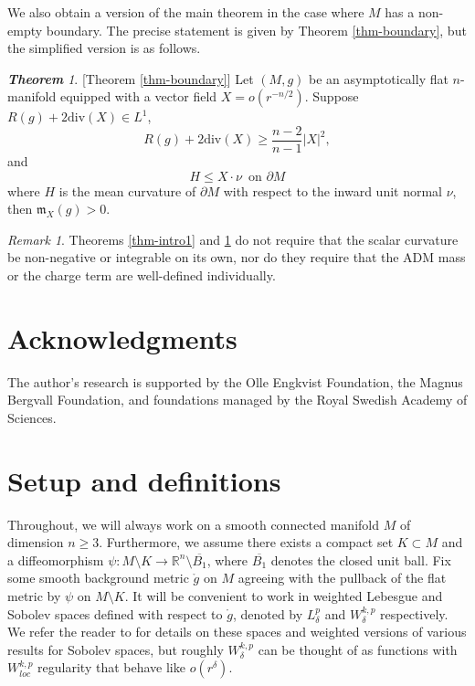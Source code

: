 \documentclass[a4paper,11pt,reqno]{amsart}
\theoremstyle{plain}
\theoremstyle{definition}
\theoremstyle{remark}
\newtheorem{rem}[thm]{Remark}
\newcommand{\m}{\mathfrak{m}}
\numberwithin{equation}{section}
\newtheorem{introthm}{\bf Theorem}
\begin{document}
We also obtain a version of the main theorem in the case where $M$ has a non-empty boundary. The precise statement is given by Theorem \ref{thm-boundary}, but the simplified version is as follows.
\begin{introthm}\label{thm-intro2}[Theorem \ref{thm-boundary}]
	Let $(M,g)$ be an asymptotically flat $n$-manifold equipped with a vector field $X=o(r^{-n/2})$. 
	Suppose $R(g)+2\mathrm{div}(X)\in L^1$,
	\begin{equation*}
		R(g)+2\mathrm{div}(X)\geq\frac{n-2}{n-1}|X|^2,
	\end{equation*}
	and
	\begin{equation*}
		H\leq X\cdot\nu\,\text{ on }\partial M
	\end{equation*}
	where $H$ is the mean curvature of $\partial M$ with respect to the inward unit normal $\nu$, then $\m_X(g)>0$.
\end{introthm}


\begin{rem}
	Theorems \ref{thm-intro1} and \ref{thm-intro2} do not require that the scalar curvature be non-negative or integrable on its own, nor do they require that the ADM mass or the charge term are well-defined individually.
\end{rem}

\section*{Acknowledgments}
The author's research is supported by the Olle Engkvist Foundation, the Magnus Bergvall Foundation, and foundations managed by the Royal Swedish Academy of Sciences.

\section{Setup and definitions}
Throughout, we will always work on a smooth connected manifold $M$ of dimension $n\geq3$. Furthermore, we assume there exists a compact set $K\subset M$ and a diffeomorphism $\psi:M\setminus K\to \mathbb R^n\setminus \overline{B_1}$, where $\overline{B_1}$ denotes the closed unit ball. Fix some smooth background metric $\mathring g$ on $M$ agreeing with the pullback of the flat metric by $\psi$ on $M\setminus K$. It will be convenient to work in weighted Lebesgue and Sobolev spaces defined with respect to $\mathring g$, denoted by $L^{p}_\delta$ and $W^{k,p}_\delta$ respectively. We refer the reader to \cite{Bartnik86} for details on these spaces and weighted versions of various results for Sobolev spaces, but roughly $W^{k,p}_\delta$ can be thought of as functions with $W^{k,p}_{loc}$ regularity that behave like $o(r^\delta)$.
\end{document}
